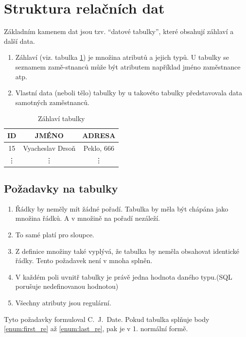 \section{Struktura relačních dat}
Základním kamenem dat jsou tzv. \enquote{datové tabulky}, které obsahují záhlaví a další data.
\begin{enumerate}
\item Záhlaví (viz. tabulka \ref{tab:zahlavi}) je množina atributů a jejich typů. U tabulky se seznamem zamě-stnanců může být atributem například jméno zaměstnance atp.
\item Vlastní data (neboli tělo) tabulky by u takovéto tabulky představovala data samotných zaměstnanců.
\end{enumerate}

\begin{table}
\caption{Záhlaví tabulky}\label{tab:zahlavi}
\begin{center}
\begin{tabular}{|c|c|c|}
\hline
ID & JMÉNO & ADRESA \\
\hline
15 & Vyacheslav Drsoň & Peklo, 666 \\
\hline
\vdots & \vdots & \vdots \\
\hline
\end{tabular}
\end{center}
\end{table}

\subsection{Požadavky na tabulky}
\begin{enumerate}
\item\label{enum:first_re} Řádky by neměly mít žádné pořadí. Tabulka by měla být chápána jako množina řádků. A v množině na pořadí nezáleží.
\item To samé platí pro sloupce.
\item Z definice množiny také vyplývá, že tabulka by neměla obsahovat identické řádky. Tento požadavek není v mnoha  splněn.
\item V každém poli uvnitř tabulky je právě jedna hodnota daného typu.(SQL porušuje nedefinovanou hodnotou)
\item\label{enum:last_re} Všechny atributy jsou regulární.
\end{enumerate}
Tyto požadavky formuloval C.~J.~Date.
Pokud tabulka splňuje body \ref{enum:first_re} až \ref{enum:last_re}, pak je v 1. normální formě.

